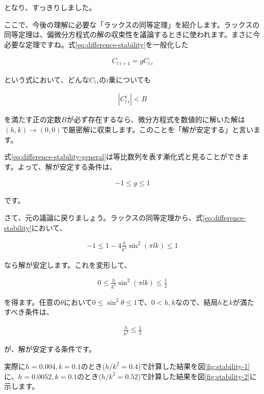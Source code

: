 \noindent
となり、すっきりしました。

ここで、今後の理解に必要な「ラックスの同等定理」を紹介します。ラックスの同等定理は、偏微分方程式の解の収束性を議論するときに使われます。まさに今必要な定理ですね。式\ref{eq:difference-stability}を一般化した

\begin{eqnarray}
    C_{l\ i+1}=gC_{l\ i}
    \label{eq:difference-stability-general}
\end{eqnarray}

\noindent
という式において、どんな$C_{l\ i}$の$i$乗についても

\begin{eqnarray}
    |C_{l\ i}^i|<B
\end{eqnarray}

\noindent
を満たす正の定数$B$が必ず存在するなら、微分方程式を数値的に解いた解は$(h,k)\rightarrow(0,0)$で厳密解に収束します。このことを「解が安定する」と言います。

式\ref{eq:difference-stability-general}は等比数列を表す漸化式と見ることができます。よって、解が安定する条件は、

\begin{eqnarray}
    -1\leq g\leq1
\end{eqnarray}

\noindent
です。

さて、元の議論に戻りましょう。ラックスの同等定理から、式\ref{eq:difference-stability}において、

\begin{eqnarray}
    -1\leq1-4\frac{h}{k^2}\sin^2(\pi lk)\leq1
\end{eqnarray}

\noindent
なら解が安定します。これを変形して、

\begin{eqnarray}
    0\leq\frac{h}{k^2}\sin^2(\pi lk)\leq\frac{1}{2}
\end{eqnarray}

\noindent
を得ます。任意の$\theta$において$0\leq\sin^2\theta\leq1$で、$0<h,k$なので、結局$h$と$k$が満たすべき条件は、

\begin{eqnarray}
    \frac{h}{k^2}\leq\frac{1}{2}
\end{eqnarray}

\noindent
が、解が安定する条件です。

実際に$h=0.004,k=0.1$のとき($h/k^2=0.4$)で計算した結果を図\ref{fig:stability-1}に、$h=0.0052,k=0.1$のとき($h/k^2=0.52$)で計算した結果を図\ref{fig:stability-2}に示します。

